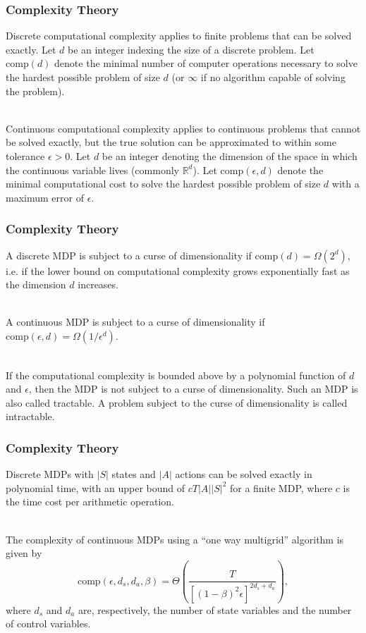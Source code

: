 \documentclass{beamer}
\begin{document}
\begin{frame}[fragile]
\frametitle{Complexity Theory}

Discrete computational complexity applies to finite problems that can be solved exactly. Let $d$ be an integer indexing the size of a discrete problem. Let $\text{comp}(d)$ denote the minimal number of computer operations necessary to solve the hardest possible problem of size $d$ (or $\infty$ if no algorithm capable of solving the problem). \\~\

Continuous computational complexity applies to continuous problems that cannot be solved exactly, but the true solution can be approximated to within some tolerance $\epsilon>0$. Let $d$ be an integer denoting the dimension of the space in which the continuous variable lives (commonly $\mathbb{R}^d$). Let $\text{comp}(\epsilon, d)$ denote the minimal computational cost to solve the hardest possible problem of size $d$ with a maximum error of $\epsilon$.
\end{frame}

\begin{frame}[fragile]
\frametitle{Complexity Theory}

A discrete MDP is subject to a curse of dimensionality if $\text{comp}(d)=\Omega(2^d)$, i.e. if the lower bound on computational complexity grows exponentially fast as the dimension $d$ increases. \\~\

A continuous MDP is subject to a curse of dimensionality if $\text{comp}(\epsilon, d)=\Omega(1/\epsilon^d)$. \\~\

If the computational complexity is bounded above by a polynomial function of $d$ and $\epsilon$, then the MDP is not subject to a curse of dimensionality. Such an MDP is also called tractable. A problem subject to the curse of dimensionality is called intractable.
\end{frame}

\begin{frame}[fragile]
\frametitle{Complexity Theory}

Discrete MDPs with $|S|$ states and $|A|$ actions can be solved exactly in polynomial time, with an upper bound of $cT|A||S|^2$ for a finite MDP, where $c$ is the time cost per arithmetic operation. \\~\

The complexity of continuous MDPs using a ``one way multigrid'' algorithm is given by
\[
\text{comp}(\epsilon, d_s, d_a, \beta)=\Theta\left(\frac{T}{[(1-\beta)^2\epsilon]^{2d_s+d_a}}\right),
\] 
where $d_s$ and $d_a$ are, respectively, the number of state variables and the number of control variables.
\end{frame}
\end{document}
